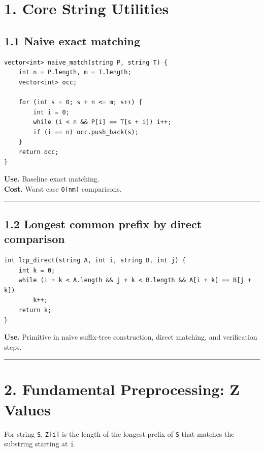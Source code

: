 \documentclass[11pt]{article}
\begin{document}
\section{1. Core String Utilities}\label{core-string-utilities}

\subsection{1.1 Naive exact matching}\label{naive-exact-matching}

\begin{verbatim}
vector<int> naive_match(string P, string T) {
    int n = P.length, m = T.length;
    vector<int> occ;

    for (int s = 0; s + n <= m; s++) {
        int i = 0;
        while (i < n && P[i] == T[s + i]) i++;
        if (i == n) occ.push_back(s);
    }
    return occ;
}
\end{verbatim}

\textbf{Use.} Baseline exact matching.\\
\textbf{Cost.} Worst case \texttt{O(nm)} comparisons.

\begin{center}\rule{0.5\linewidth}{0.5pt}\end{center}

\subsection{1.2 Longest common prefix by direct comparison}\label{longest-common-prefix-by-direct-comparison}

\begin{verbatim}
int lcp_direct(string A, int i, string B, int j) {
    int k = 0;
    while (i + k < A.length && j + k < B.length && A[i + k] == B[j + k])
        k++;
    return k;
}
\end{verbatim}

\textbf{Use.} Primitive in naive suffix-tree construction, direct matching, and verification steps.

\begin{center}\rule{0.5\linewidth}{0.5pt}\end{center}

\section{2. Fundamental Preprocessing: Z Values}\label{fundamental-preprocessing-z-values}

For string \texttt{S}, \texttt{Z[i]} is the length of the longest prefix of \texttt{S} that matches the substring starting at \texttt{i}.
\end{document}
